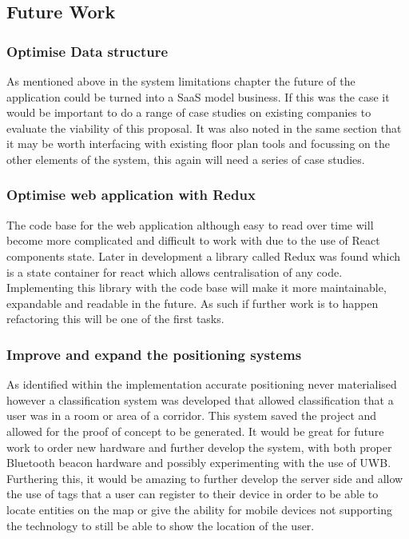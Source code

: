 \subsection{Future Work}
\subsubsection{Optimise Data structure}
As mentioned above in the system limitations chapter the future of the application could be turned into a SaaS model business. If this was the case it would be important to do a range of case studies on existing companies to evaluate the viability of this proposal. It was also noted in the same section that it may be worth interfacing with existing floor plan tools and focussing on the other elements of the system, this again will need a series of case studies.
\subsubsection{Optimise web application with Redux}
The code base for the web application although easy to read over time will become more complicated and difficult to work with due to the use of React components state. Later in development a library called Redux was found which is a state container for react which allows centralisation of any code. Implementing this library with the code base will make it more maintainable, expandable and readable in the future. As such if further work is to happen refactoring this will be one of the first tasks.

\subsubsection{Improve and expand the positioning systems}
As identified within the implementation accurate positioning never materialised however a classification system was developed that allowed classification that a user was in a room or area of a corridor. This system saved the project and allowed for the proof of concept to be generated. It would be great for future work to order new hardware and further develop the system, with both proper Bluetooth beacon hardware and possibly experimenting with the use of UWB. Furthering this, it would be amazing to further develop the server side and allow the use of tags that a user can register to their device in order to be able to locate entities on the map or give the ability for mobile devices not supporting the technology to still be able to show the location of the user.

